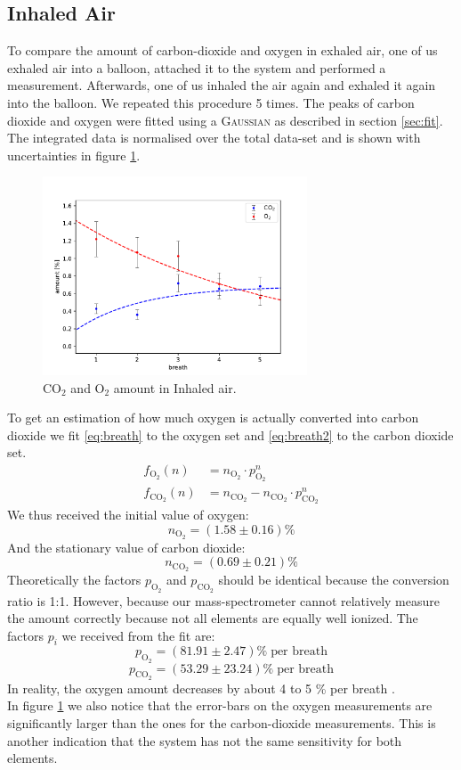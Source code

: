     \newpage
    \subsection{Inhaled Air}
    To compare the amount of carbon-dioxide and oxygen in exhaled air, one of us exhaled air into a balloon, attached it to the system and performed a measurement. Afterwards, one of us inhaled the air again and exhaled it again into the balloon. We repeated this procedure 5 times. The peaks of carbon dioxide and oxygen were fitted using a {\scshape Gaussian} as described in section \ref{sec:fit}. The integrated data is normalised over the total data-set and is shown with uncertainties in figure \ref{fig:air}. 
    \begin{figure}[h!]
        \centering
        \includegraphics[width=0.7\textwidth]{Report/DataResultsPlots/air.pdf}
        \caption{CO$_2$ and O$_2$ amount in Inhaled air.}
        \label{fig:air}
    \end{figure}
    To get an estimation of how much oxygen is actually converted into carbon dioxide we fit \eqref{eq:breath} to the oxygen set and \eqref{eq:breath2} to the carbon dioxide set.
    \begin{align}
        f_{\text{O}_2}(n) &= n_{\text{O}_2} \cdot p_{\text{O}_2}^n \label{eq:breath}\\
        f_{\text{CO}_2}(n) &= n_{\text{CO}_2} - n_{\text{CO}_2} \cdot p_{\text{CO}_2}^n \label{eq:breath2}
    \end{align}
    We thus received the initial value of oxygen:
    $$ n_{\text{O}_2} = (1.58 \pm 0.16) \%$$
    And the stationary value of carbon dioxide:
    $$ n_{\text{CO}_2} = (0.69 \pm 0.21) \%$$
    Theoretically the factors $p_{\text{O}_2}$ and $p_{\text{CO}_2}$ should be identical because the conversion ratio is 1:1. However, because our mass-spectrometer cannot relatively measure the amount correctly because not all elements are equally well ionized. The factors $p_i$ we received from the fit are:
    $$p_{\text{O}_2} = (81.91 \pm 2.47) \%\;\text{per breath}$$
    $$p_{\text{CO}_2} = (53.29 \pm 23.24) \%\;\text{per breath}$$
    In reality, the oxygen amount decreases by about 4 to 5 \% per breath \cite{breath}.\\
    In figure \ref{fig:air} we also notice that the error-bars on the oxygen measurements are significantly larger than the ones for the carbon-dioxide measurements. This is another indication that the system has not the same sensitivity for both elements.
    
